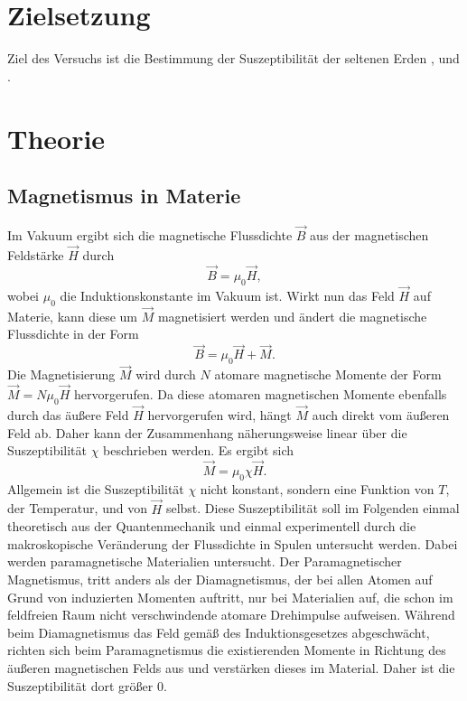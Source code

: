 \section{Zielsetzung}
Ziel des Versuchs ist die Bestimmung der Suszeptibilität der seltenen Erden
, und .
\section{Theorie}
\label{sec:Theorie}
\subsection{Magnetismus in Materie}
Im Vakuum ergibt sich die magnetische Flussdichte $\vec{B}$ aus der magnetischen Feldstärke $\vec{H}$
durch 
\begin{equation}
    \vec{B}= \mu_0 \vec{H},
    \label{eq:BVakuum}
\end{equation}
wobei $\mu_0$ die Induktionskonstante im Vakuum ist.
Wirkt nun das Feld $\vec{H}$ auf Materie, kann diese um $\vec{M}$ magnetisiert werden und ändert
die magnetische Flussdichte in der Form
\begin{equation}
    \vec{B}= \mu_0 \vec{H}+\vec{M}.
    \label{eq:BMaterie}
\end{equation}
Die Magnetisierung $\vec{M}$ wird durch $N$ atomare magnetische Momente der Form 
$\vec{M}=N\mu_0 \vec{H}$ hervorgerufen. Da diese atomaren magnetischen Momente ebenfalls durch 
das äußere Feld $\vec{H}$ hervorgerufen wird, hängt $\vec{M}$ auch direkt vom äußeren Feld ab.
Daher kann der Zusammenhang näherungsweise linear über die Suszeptibilität $\chi$ beschrieben werden.
Es ergibt sich
\begin{equation}
    \vec{M}= \mu_0 \chi \vec{H}.
    \label{eq:MMakro}
\end{equation}
Allgemein ist die Suszeptibilität $\chi$ nicht konstant, sondern eine Funktion von $T$, der Temperatur, und von $\vec{H}$ selbst.
Diese Suszeptibilität soll im Folgenden einmal theoretisch aus der Quantenmechanik und einmal experimentell
durch die makroskopische Veränderung der Flussdichte in Spulen untersucht werden.
Dabei werden paramagnetische Materialien untersucht. Der Paramagnetischer Magnetismus,
tritt anders als der Diamagnetismus, der bei allen Atomen auf Grund von induzierten Momenten 
auftritt, nur bei Materialien auf, die schon im feldfreien Raum nicht verschwindende atomare
Drehimpulse aufweisen. Während beim Diamagnetismus das Feld gemäß des Induktionsgesetzes abgeschwächt,
richten sich beim Paramagnetismus die existierenden Momente in Richtung des äußeren magnetischen 
Felds aus und verstärken dieses im Material. Daher ist die Suszeptibilität dort größer 0.

